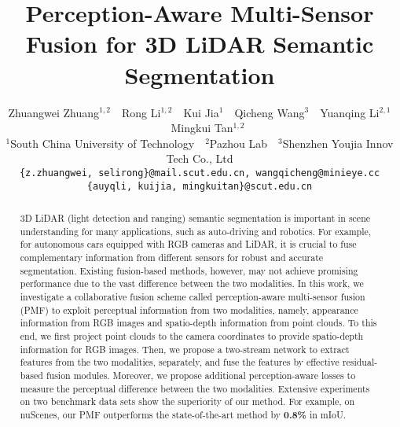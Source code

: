 \documentclass[10pt,twocolumn,letterpaper]{article}
\begin{document}
\title{Perception-Aware Multi-Sensor Fusion for 3D LiDAR Semantic Segmentation}

\author{Zhuangwei Zhuang$^{1,2}$~~Rong Li$^{1,2}$~~Kui Jia$^1$~~Qicheng Wang$^3$~~Yuanqing Li$^{2,1}$\footnotemark[2]~~~Mingkui Tan$^{1,2}$\footnotemark[2]\\
$^1$South China University of Technology~~$^2$Pazhou Lab~~$^3$Shenzhen Youjia Innov Tech Co., Ltd\\
{\tt\small \{z.zhuangwei, selirong\}@mail.scut.edu.cn, wangqicheng@minieye.cc} \\ {\tt\small \{auyqli, kuijia, mingkuitan\}@scut.edu.cn}
}

\maketitle
\ificcvfinal\thispagestyle{empty}\fi

\renewcommand{\thefootnote}{\fnsymbol{footnote}}
\renewcommand{\thefootnote}{\arabic{footnote}}

\begin{abstract}
    3D LiDAR (light detection and ranging) semantic segmentation is important in scene understanding for many applications, such as auto-driving and robotics. For example, for autonomous cars equipped with RGB cameras and LiDAR, it is crucial to fuse complementary information from different sensors for robust and accurate segmentation. Existing fusion-based methods, however, may not achieve promising performance due to the vast difference between the two modalities. In this work, we investigate a collaborative fusion scheme called perception-aware multi-sensor fusion (PMF) to exploit perceptual information from two modalities, namely, appearance information from RGB images and spatio-depth information from point clouds. To this end, we first project point clouds to the camera coordinates to provide spatio-depth information for RGB images. Then, we propose a two-stream network to extract features from the two modalities, separately, and fuse the features by effective residual-based fusion modules. Moreover, we propose additional perception-aware losses to measure the perceptual difference between the two modalities. Extensive experiments on two benchmark data sets show the superiority of our method. For example, on nuScenes, our PMF outperforms the state-of-the-art method by \textbf{0.8\%} in mIoU.
    












\end{abstract}
\end{document}
